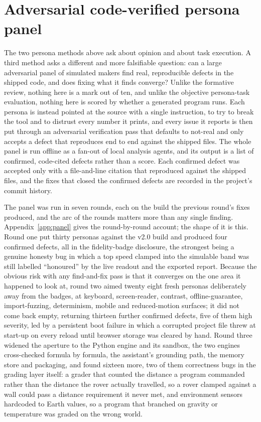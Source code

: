 \documentclass[11pt,a4paper]{report}
\begin{document}
\section{Adversarial code-verified persona panel}
\label{sec:panel}
The two persona methods above ask about opinion and about task execution. A third method asks a different and more falsifiable question: can a large adversarial panel of simulated makers find real, reproducible defects in the shipped code, and does fixing what it finds converge? Unlike the formative review, nothing here is a mark out of ten, and unlike the objective persona-task evaluation, nothing here is scored by whether a generated program runs. Each persona is instead pointed at the source with a single instruction, to try to break the tool and to distrust every number it prints, and every issue it reports is then put through an adversarial verification pass that defaults to not-real and only accepts a defect that reproduces end to end against the shipped files. The whole panel is run offline as a fan-out of local analysis agents, and its output is a list of confirmed, code-cited defects rather than a score. Each confirmed defect was accepted only with a file-and-line citation that reproduced against the shipped files, and the fixes that closed the confirmed defects are recorded in the project's commit history.

The panel was run in seven rounds, each on the build the previous round's fixes produced, and the arc of the rounds matters more than any single finding. Appendix~\ref{app:panel} gives the round-by-round account; the shape of it is this. Round one put thirty personas against the v2.0 build and produced four confirmed defects, all in the fidelity-badge disclosure, the strongest being a genuine honesty bug in which a top speed clamped into the simulable band was still labelled ``honoured'' by the live readout and the exported report. Because the obvious risk with any find-and-fix pass is that it converges on the one area it happened to look at, round two aimed twenty eight fresh personas deliberately away from the badges, at keyboard, screen-reader, contrast, offline-guarantee, import-fuzzing, determinism, mobile and reduced-motion surfaces; it did not come back empty, returning thirteen further confirmed defects, five of them high severity, led by a persistent boot failure in which a corrupted project file threw at start-up on every reload until browser storage was cleared by hand. Round three widened the aperture to the Python engine and its sandbox, the two engines cross-checked formula by formula, the assistant's grounding path, the memory store and packaging, and found sixteen more, two of them correctness bugs in the grading layer itself: a grader that counted the distance a program commanded rather than the distance the rover actually travelled, so a rover clamped against a wall could pass a distance requirement it never met, and environment sensors hardcoded to Earth values, so a program that branched on gravity or temperature was graded on the wrong world.
\end{document}
